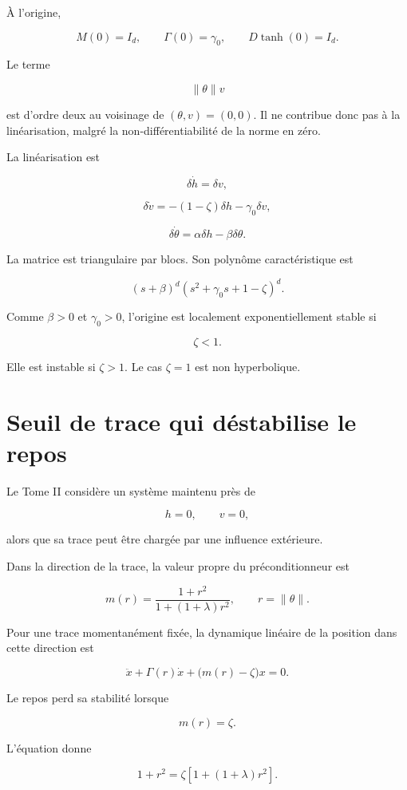 À l'origine,

\[
M(0)=I_d,
\qquad
\Gamma(0)=\gamma_0,
\qquad
D\tanh(0)=I_d.
\]

Le terme

\[
\|\theta\|v
\]

est d'ordre deux au voisinage de \((\theta,v)=(0,0)\). Il ne contribue
donc pas à la linéarisation, malgré la non-différentiabilité de la
norme en zéro.

La linéarisation est

\[
\delta\dot h=\delta v,
\]

\[
\delta\dot v
=
-(1-\zeta)\delta h
-
\gamma_0\delta v,
\]

\[
\delta\dot\theta
=
\alpha\delta h
-
\beta\delta\theta.
\]

La matrice est triangulaire par blocs. Son polynôme caractéristique
est

\[
\boxed{
(s+\beta)^d
\left(
s^2+\gamma_0s+1-\zeta
\right)^d.
}
\]

Comme \(\beta>0\) et \(\gamma_0>0\), l'origine est localement
exponentiellement stable si

\[
\boxed{\zeta<1}.
\]

Elle est instable si \(\zeta>1\). Le cas \(\zeta=1\) est
non hyperbolique.

\section{Seuil de trace qui déstabilise le repos}
\label{annexe-reduction-seuil-trace}

Le Tome II considère un système maintenu près de

\[
h=0,
\qquad
v=0,
\]

alors que sa trace peut être chargée par une influence extérieure.

Dans la direction de la trace, la valeur propre du préconditionneur
est

\[
m(r)
=
\frac{1+r^2}
{1+(1+\lambda)r^2},
\qquad
r=\|\theta\|.
\]

Pour une trace momentanément fixée, la dynamique linéaire de la
position dans cette direction est

\[
\ddot x
+
\Gamma(r)\dot x
+
\bigl(m(r)-\zeta\bigr)x
=
0.
\]

Le repos perd sa stabilité lorsque

\[
m(r)=\zeta.
\]

L'équation donne

\[
1+r^2
=
\zeta
\left[
1+(1+\lambda)r^2
\right].
\]


